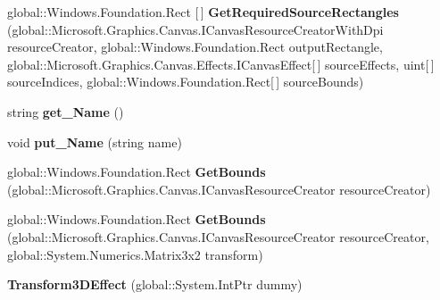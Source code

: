 \begin{DoxyCompactItemize}
global\+::\+Windows.\+Foundation.\+Rect \mbox{[}$\,$\mbox{]} {\bfseries Get\+Required\+Source\+Rectangles} (global\+::\+Microsoft.\+Graphics.\+Canvas.\+I\+Canvas\+Resource\+Creator\+With\+Dpi resource\+Creator, global\+::\+Windows.\+Foundation.\+Rect output\+Rectangle, global\+::\+Microsoft.\+Graphics.\+Canvas.\+Effects.\+I\+Canvas\+Effect\mbox{[}$\,$\mbox{]} source\+Effects, uint\mbox{[}$\,$\mbox{]} source\+Indices, global\+::\+Windows.\+Foundation.\+Rect\mbox{[}$\,$\mbox{]} source\+Bounds)
\item 
\mbox{\label{class_microsoft_1_1_graphics_1_1_canvas_1_1_effects_1_1_transform3_d_effect_abeb49b0cd72d2a8a1ee087855183220b}} 
string {\bfseries get\+\_\+\+Name} ()
\item 
\mbox{\label{class_microsoft_1_1_graphics_1_1_canvas_1_1_effects_1_1_transform3_d_effect_aee37d65325d885f638ac7db9a43f1363}} 
void {\bfseries put\+\_\+\+Name} (string name)
\item 
\mbox{\label{class_microsoft_1_1_graphics_1_1_canvas_1_1_effects_1_1_transform3_d_effect_ae3e5b20ce4cd94f594d9b50fc74ee771}} 
global\+::\+Windows.\+Foundation.\+Rect {\bfseries Get\+Bounds} (global\+::\+Microsoft.\+Graphics.\+Canvas.\+I\+Canvas\+Resource\+Creator resource\+Creator)
\item 
\mbox{\label{class_microsoft_1_1_graphics_1_1_canvas_1_1_effects_1_1_transform3_d_effect_a9e9d12b267f452ee3aa3b6b19363d355}} 
global\+::\+Windows.\+Foundation.\+Rect {\bfseries Get\+Bounds} (global\+::\+Microsoft.\+Graphics.\+Canvas.\+I\+Canvas\+Resource\+Creator resource\+Creator, global\+::\+System.\+Numerics.\+Matrix3x2 transform)
\item 
\mbox{\label{class_microsoft_1_1_graphics_1_1_canvas_1_1_effects_1_1_transform3_d_effect_af7099edb8f0d394bed7b6d387eb4c183}} 
{\bfseries Transform3\+D\+Effect} (global\+::\+System.\+Int\+Ptr dummy)
\item 
\mbox{\label{class_microsoft_1_1_graphics_1_1_canvas_1_1_effects_1_1_transform3_d_effect_a9623fd7e2c02c46327c72133773725c1}} 

\end{DoxyCompactItemize}
